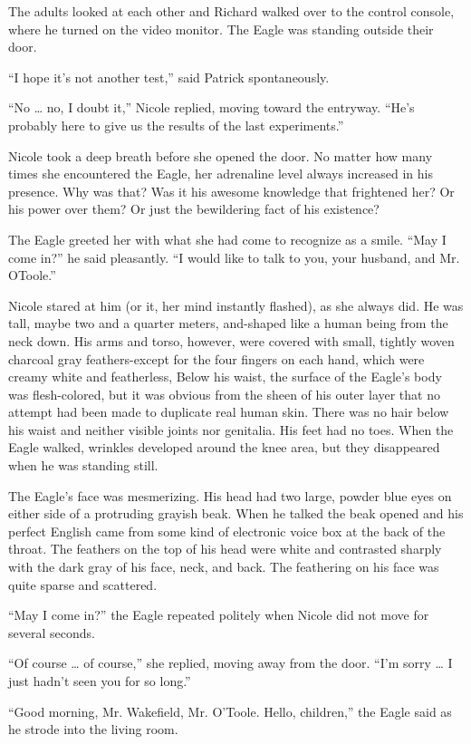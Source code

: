 \documentclass[]{article}
\begin{document}
{The adults looked at each other and Richard walked over to the control console, where he turned on the video monitor.  The Eagle was standing outside their door.

“I hope it’s not another test,” said Patrick spontaneously.

“No … no, I doubt it,” Nicole replied, moving toward the entryway.  “He’s probably here to give us the results of the last experiments.”

Nicole took a deep breath before she opened the door.  No matter how many times she encountered the Eagle, her adrenaline level always increased in his presence.  Why was that? Was it his awesome knowledge that frightened her? Or his power over them? Or just the bewildering fact of his existence?

The Eagle greeted her with what she had come to recognize as a smile.  “May I come in?” he said pleasantly.  “I would like to talk to you, your husband, and Mr.  OToole.”

Nicole stared at him (or it, her mind instantly flashed), as she always did.  He was tall, maybe two and a quarter meters, and-shaped like a human being from the neck down.  His arms and torso, however, were covered with small, tightly woven charcoal gray feathers-except for the four fingers on each hand, which were creamy white and featherless, Below his waist, the surface of the Eagle’s body was flesh-colored, but it was obvious from the sheen of his outer layer that no attempt had been made to duplicate real human skin.  There was no hair below his waist and neither visible joints nor genitalia.  His feet had no toes.  When the Eagle walked, wrinkles developed around the knee area, but they disappeared when he was standing still.

The Eagle’s face was mesmerizing.  His head had two large, powder blue eyes on either side of a protruding grayish beak.  When he talked the beak opened and his perfect English came from some kind of electronic voice box at the back of the throat.  The feathers on the top of his head were white and contrasted sharply with the dark gray of his face, neck, and back.  The feathering on his face was quite sparse and scattered.

“May I come in?” the Eagle repeated politely when Nicole did not move for several seconds.

“Of course … of course,” she replied, moving away from the door.  “I’m sorry … I just hadn’t seen you for so long.”

“Good morning, Mr.  Wakefield, Mr.  O’Toole.  Hello, children,” the Eagle said as he strode into the living room.

}
\end{document}
